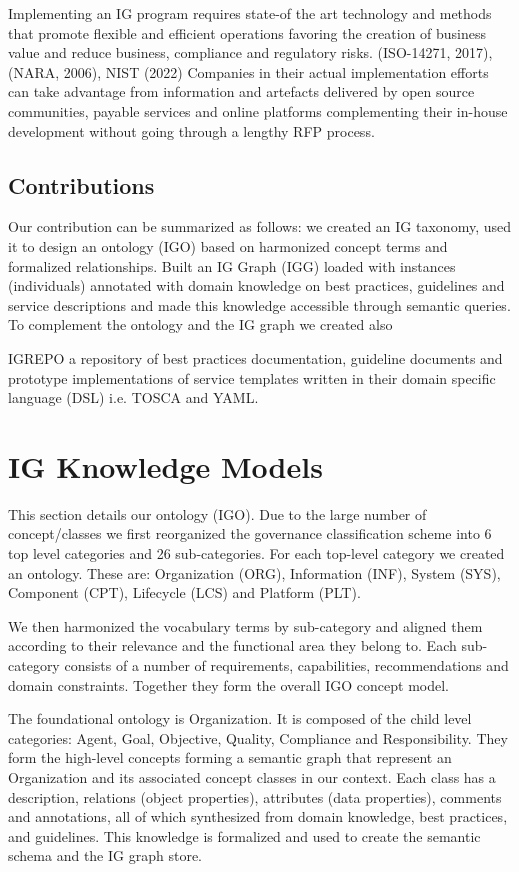 \documentclass[runningheads]{llncs}
\begin{document}
Implementing an IG program requires state-of the art technology and methods that promote flexible and efficient operations favoring the creation of business value and reduce business, compliance and regulatory risks. (ISO-14271, 2017), (NARA, 2006), NIST (2022)
Companies in their actual implementation efforts can take advantage from information and artefacts delivered by open source communities, payable services and online platforms complementing their in-house development without going through a lengthy RFP process. 
\subsection{Contributions}

Our contribution can be summarized as follows: we created an IG taxonomy, used it to design an ontology (IGO) based on harmonized concept terms and formalized relationships. Built an IG Graph (IGG) loaded with instances (individuals) annotated with domain knowledge on best practices, guidelines and service descriptions and made this knowledge accessible through semantic queries. To complement the ontology and the IG graph we created also   

IGREPO a repository of best practices documentation, guideline documents and prototype implementations of service templates written in their domain specific language (DSL) i.e. TOSCA and YAML.


\section{IG Knowledge Models}
This section details our ontology (IGO). Due to the large number of concept/classes we first reorganized the governance classification scheme into 6 top level categories and 26 sub-categories. For each top-level category we created an ontology. These are: Organization (ORG), Information (INF), System (SYS), Component (CPT), Lifecycle (LCS) and Platform (PLT). 

We then harmonized the vocabulary terms by sub-category and aligned them according to their relevance and the functional area they belong to. Each sub-category consists of a number of requirements, capabilities, recommendations and domain constraints. Together they form the overall IGO concept model. 

The foundational ontology is Organization. It is composed of the child level categories: Agent, Goal, Objective, Quality, Compliance and Responsibility. They form the high-level concepts forming a semantic graph that represent an Organization and its associated concept classes in our context.  Each class has a description, relations (object properties), attributes (data properties), comments and annotations, all of which synthesized from domain knowledge, best practices, and guidelines. This knowledge is formalized and used to create the semantic schema and the IG graph store.
\end{document}
